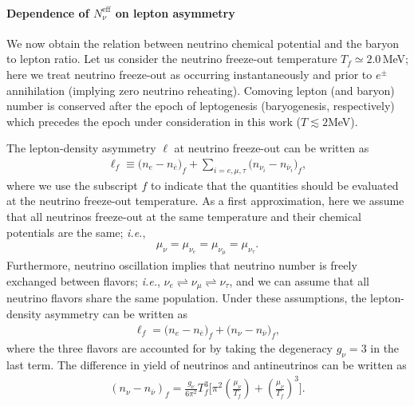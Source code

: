 \paragraph{Dependence of $N_\nu^{\mathrm{eff}}$ on lepton asymmetry}
We now obtain the relation between neutrino chemical potential and the baryon to lepton ratio. Let us consider the neutrino freeze-out temperature $T_f\simeq 2.0$\,MeV; here we treat neutrino freeze-out as occurring instantaneously and prior to $e^\pm$ annihilation (implying zero neutrino reheating). Comoving lepton (and baryon) number is conserved after the epoch of leptogenesis (baryogenesis, respectively) which precedes the epoch  under consideration in this work ($T\lesssim 2$\;MeV). %

The lepton-density asymmetry $\ell $ at neutrino freeze-out can be written as
\begin{align}
\ell_f \equiv\big(n_e-n_{\overline{e}}\big)_f+\sum_{i=e,\mu, \tau}\big(n_{\nu_i}-n_{\overline{\nu}_i}\big)_f,
\end{align}
where we use the subscript $f$ to indicate that the quantities should be evaluated at the neutrino freeze-out temperature. As a first approximation, here we assume that all neutrinos freeze-out at the same temperature and their chemical potentials are the same; {\it i.e.\/},
\begin{align}
\mu_\nu=\mu_{\nu_e}=\mu_{\nu_\mu}=\mu_{\nu_\tau}.
\end{align}
Furthermore, neutrino oscillation implies that neutrino number is freely exchanged between flavors; {\it i.e.\/}, $\nu_e\rightleftharpoons\nu_\mu\rightleftharpoons\nu_\tau$, and we can assume that all neutrino flavors share the same population. Under these assumptions, the lepton-density asymmetry can be written as
\begin{align}
\label{L_asymmetry} 
\ell_f=\big(n_e-n_{\overline{e}}\big)_f+\big(n_{\nu}-n_{\overline{\nu}}\big)_f,
\end{align}
where the three flavors are accounted for by taking the degeneracy $g_\nu=3$ in the last term. The difference in yield of neutrinos and antineutrinos can be written as
\begin{align}
\label{Excess_Neutrino}
\left(n_\nu-n_{\overline{\nu}}\right)_f=\frac{g_\nu}{6\pi^2}T^3_f\bigg[\pi^2\left(\frac{\mu_\nu}{T_f}\right)+\left(\frac{\mu_\nu}{T_f}\right)^{\!\!3}\bigg].
\end{align}


